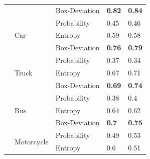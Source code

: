 \begin{table}[H]
\begin{tabular}{lllll}
                                     &                               & Box-Deviation & \textbf{0.82}              & \textbf{0.84}                                                           \\ \cline{2-5} 
                                     & \multirow{3}{*}{Car}          & Probability   & 0.45              & 0.46                                                           \\ \cline{3-5} 
                                     &                               & Entropy       & 0.59              & 0.58                                                           \\ \cline{3-5} 
                                     &                               & Box-Deviation & \textbf{0.76}              & \textbf{0.79}                                                           \\ \cline{2-5} 
                                     & \multirow{3}{*}{Truck}        & Probability   & 0.37              & 0.34                                                           \\ \cline{3-5} 
                                     &                               & Entropy       & 0.67              & 0.71                                                           \\ \cline{3-5} 
                                     &                               & Box-Deviation & \textbf{0.69}              & \textbf{0.74}                                                           \\ \cline{2-5} 
                                     & \multirow{3}{*}{Bus}          & Probability   & 0.38              & 0.4                                                            \\ \cline{3-5} 
                                     &                               & Entropy       & 0.64              & 0.62                                                           \\ \cline{3-5} 
                                     &                               & Box-Deviation & \textbf{0.7}               & \textbf{0.75}                                                           \\ \cline{2-5} 
                                     & \multirow{3}{*}{Motorcycle}   & Probability   & 0.49              & 0.53                                                           \\ \cline{3-5} 
                                     &                               & Entropy       & 0.6               & 0.51                                                           \\ \cline{3-5} 

\end{tabular}
\end{table}
